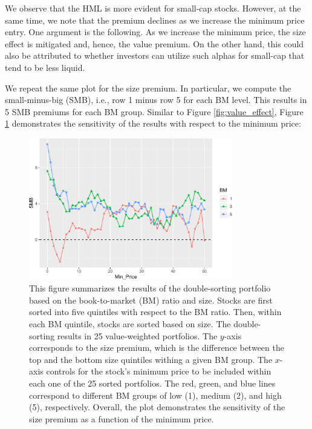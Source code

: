 We observe that the HML is more evident for small-cap stocks. However,
at the same time, we note that the premium declines as we increase the minimum price entry. One argument is the following. As we increase the minimum price, the size effect is mitigated and, hence, the value premium. On the other hand, this could also be attributed to whether
investors can utilize such alphas for small-cap that tend to be less
liquid.

We repeat the same plot for the size premium. In particular, we compute the small-minus-big (SMB), i.e., row 1 minus row 5 for each BM level. This results in 5 SMB premiums for each BM group. Similar to Figure \ref{fig:value_effect}, Figure \ref{fig:size_effect} demonstrates the sensitivity of the results with respect to the minimum price:
\begin{Schunk}
\end{Schunk}

\begin{figure}
\caption{This figure summarizes the results of the double-sorting portfolio based on the book-to-market (BM) ratio and size. Stocks are first sorted into five quintiles with respect to the BM ratio. Then, within each BM quintile, stocks are sorted based on size. The double-sorting results in 25 value-weighted portfolios. The $y$-axis corresponds to the size premium, which is the difference between the top and the bottom size quintiles withing a given BM group. The $x$-axis controls for the stock's minimum price to be included within each one of the 25 sorted portfolios. The red, green, and blue lines correspond to different BM groups of low (1), medium (2), and high (5), respectively. Overall, the plot demonstrates the sensitivity of the size premium as a function of the minimum price. 
}
\label{fig:size_effect}
\begin{center}\includegraphics[width = 3.5in]{CRSP_COMP_files/figure-latex/unnamed-chunk-41-1} \end{center}
\end{figure}


